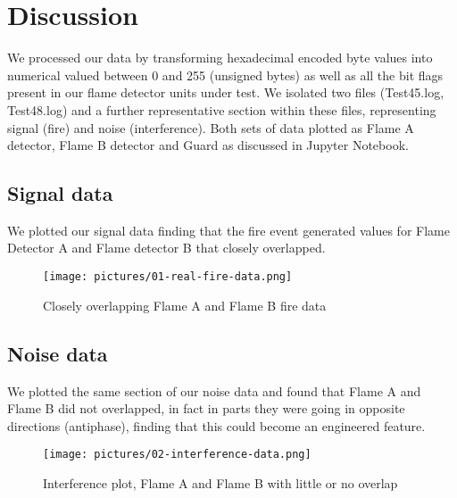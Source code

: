 \section{Discussion}

We processed our data by transforming hexadecimal encoded byte values into numerical valued between 0 and 255 (unsigned bytes) as well as all the bit flags present in our flame detector units under test. We isolated two files (Test45.log, Test48.log) and a further representative section within these files, representing signal (fire) and noise (interference). Both sets of data plotted as Flame A detector, Flame B detector and Guard as discussed in Jupyter Notebook.

\subsection{Signal data}

We plotted our signal data finding that the fire event generated values for Flame Detector A and Flame detector B that closely overlapped.

\begin{figure}[tb]
 \centering %
 \texttt{[image: pictures/01-real-fire-data.png]}
 \caption{Closely overlapping Flame A and Flame B fire data}
 \label{fig:sample}
\end{figure}

\subsection{Noise data}

We plotted the same section of our noise data and found that Flame A and Flame B did not overlapped, in fact in parts they were going in opposite directions (antiphase), finding that this could become an engineered feature.

\begin{figure}[tb]
 \centering %
 \texttt{[image: pictures/02-interference-data.png]}
 \caption{Interference plot, Flame A and Flame B with little or no overlap}
 \label{fig:sample}
\end{figure}

